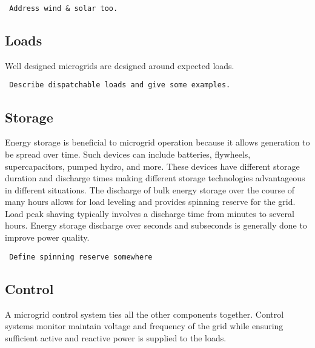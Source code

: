 \begin{verbatim} 
 Address wind & solar too.
\end{verbatim}

\subsection{Loads}
Well designed microgrids are designed around expected loads. 
\begin{verbatim} 
 Describe dispatchable loads and give some examples. 
\end{verbatim}

\subsection{Storage}
Energy storage is beneficial to microgrid operation because it allows generation to be spread over time. Such devices can include batteries, flywheels, supercapacitors, pumped hydro, and more. These devices have different storage duration and discharge times making different storage technologies advantageous in different situations. The discharge of bulk energy storage over the course of many hours allows for load leveling and provides spinning reserve for the grid. Load peak shaving typically involves a discharge time from minutes to several hours. Energy storage discharge over seconds and subseconds is generally done to improve power quality. \cite{Schoenung2003}
\begin{verbatim}
 Define spinning reserve somewhere
\end{verbatim}

\subsection{Control}
A microgrid control system ties all the other components together. Control systems monitor maintain voltage and frequency of the grid while ensuring sufficient active and reactive power is supplied to the loads.
